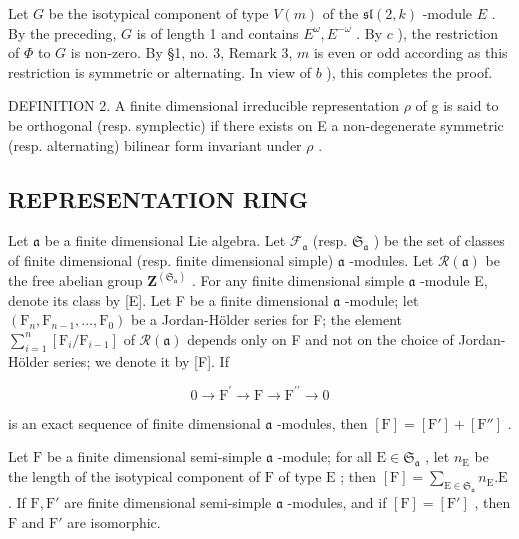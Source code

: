 Let \(G\) be the isotypical component of type \(V(m)\) of the \(\mathfrak{sl}(2, k)\) -module \(E\) . By the preceding, \(G\) is of length 1 and contains \(E^{\omega}, E^{-\omega}\) . By \(c\) ), the restriction of \(\Phi\) to \(G\) is non-zero. By §1, no. 3, Remark 3, \(m\) is even or odd according as this restriction is symmetric or alternating. In view of \(b\) ), this completes the proof.

DEFINITION 2. A finite dimensional irreducible representation \(\rho\) of g is said to be orthogonal (resp. symplectic) if there exists on E a non-degenerate symmetric (resp. alternating) bilinear form invariant under \(\rho\) .

\subsection{REPRESENTATION RING}

Let \(\mathfrak{a}\) be a finite dimensional Lie algebra. Let \(\mathcal{F}_{\mathfrak{a}}\) (resp. \(\mathfrak{S}_{\mathfrak{a}}\) ) be the set of classes of finite dimensional (resp. finite dimensional simple) \(\mathfrak{a}\) -modules. Let \(\mathcal{R}(\mathfrak{a})\) be the free abelian group \(\mathbf{Z}^{(\mathfrak{S}_{\mathfrak{a}})}\) . For any finite dimensional simple \(\mathfrak{a}\) -module E, denote its class by {[}E{]}. Let F be a finite dimensional \(\mathfrak{a}\) -module; let \((\mathrm{F}_n,\mathrm{F}_{n - 1},\dots ,\mathrm{F}_0)\) be a Jordan-Hölder series for F; the element \(\sum_{i = 1}^{n}[\mathrm{F}_i / \mathrm{F}_{i - 1}]\) of \(\mathcal{R}(\mathfrak{a})\) depends only on F and not on the choice of Jordan-Hölder series; we denote it by {[}F{]}. If

\[
0 \longrightarrow \mathrm{F} ^ {\prime} \longrightarrow \mathrm{F} \longrightarrow \mathrm{F} ^ {\prime \prime} \longrightarrow 0
\]

is an exact sequence of finite dimensional \(\mathfrak{a}\) -modules, then \([\mathrm{F}] = [\mathrm{F}'] + [\mathrm{F}'']\) .

Let \(\mathrm{F}\) be a finite dimensional semi-simple \(\mathfrak{a}\) -module; for all \(\mathrm{E} \in \mathfrak{S}_{\mathfrak{a}}\) , let \(n_{\mathrm{E}}\) be the length of the isotypical component of \(\mathrm{F}\) of type \(\mathrm{E}\) ; then \([\mathrm{F}] = \sum_{\mathrm{E} \in \mathfrak{S}_{\mathfrak{a}}} n_{\mathrm{E}}. \mathrm{E}\) . If \(\mathrm{F}, \mathrm{F}'\) are finite dimensional semi-simple \(\mathfrak{a}\) -modules, and if \([\mathrm{F}] = [\mathrm{F}']\) , then \(\mathrm{F}\) and \(\mathrm{F}'\) are isomorphic.

